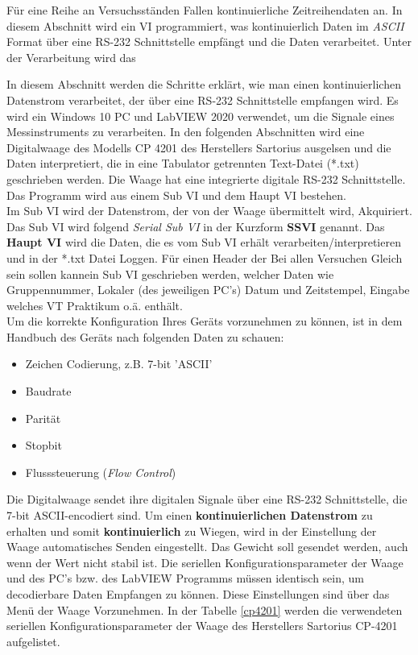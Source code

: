 \documentclass[
fontsize=12pt, 
paper=a4, 
BCOR=10mm, 
twoside=false,
 DIV=10, 
 headsepline, 
 footsepline
 ]{scrartcl}
\begin{document}
Für eine Reihe an Versuchsständen Fallen kontinuierliche Zeitreihendaten an. In diesem Abschnitt wird ein VI programmiert, was kontinuierlich Daten im \textit{ASCII} Format über eine RS-232 Schnittstelle empfängt und die Daten verarbeitet. Unter der Verarbeitung wird das 

In diesem Abschnitt werden die Schritte erklärt, wie man einen kontinuierlichen Datenstrom verarbeitet, der über eine RS-232 Schnittstelle empfangen wird. Es wird ein Windows 10 PC und LabVIEW 2020 verwendet, um die Signale eines Messinstruments zu verarbeiten. In den folgenden Abschnitten wird eine Digitalwaage des Modells CP 4201 des Herstellers Sartorius ausgelsen und die Daten interpretiert, die in eine Tabulator getrennten Text-Datei (*.txt) geschrieben werden. Die Waage hat eine integrierte digitale RS-232 Schnittstelle. Das Programm wird aus einem Sub VI und dem Haupt VI bestehen. \\


Im Sub VI wird der Datenstrom, der von der Waage übermittelt wird, Akquiriert. Das Sub VI wird folgend \textit{Serial Sub VI} in der Kurzform \textbf{SSVI} genannt. Das \textbf{Haupt VI} wird die Daten, die es vom Sub VI erhält verarbeiten/interpretieren und in der *.txt Datei Loggen. Für einen Header der Bei allen Versuchen Gleich sein sollen kannein Sub VI geschrieben werden, welcher Daten wie Gruppennummer, Lokaler (des jeweiligen PC's) Datum und Zeitstempel, Eingabe welches VT Praktikum o.ä. enthält.\\

Um die korrekte Konfiguration Ihres Geräts vorzunehmen zu können, ist in dem Handbuch des Geräts nach folgenden Daten zu schauen:

\begin{itemize}
\item Zeichen Codierung, z.B. 7-bit 'ASCII'
\item Baudrate
\item Parität
\item Stopbit
\item Flusssteuerung (\textit{Flow Control})
\end{itemize}

Die Digitalwaage sendet ihre digitalen Signale über eine RS-232 Schnittstelle, die 7-bit ASCII-encodiert sind. Um einen \textbf{kontinuierlichen Datenstrom} zu erhalten und somit \textbf{kontinuierlich} zu Wiegen, wird in der Einstellung der Waage \glqq automatisches Senden\grqq{} eingestellt. Das Gewicht soll gesendet werden, auch wenn der Wert nicht stabil ist. Die seriellen Konfigurationsparameter der Waage und des PC's bzw. des LabVIEW Programms müssen identisch sein, um decodierbare Daten Empfangen zu können. Diese Einstellungen sind über das Menü der Waage Vorzunehmen. In der Tabelle \ref{cp4201} werden die verwendeten seriellen Konfigurationsparameter der Waage des Herstellers Sartorius CP-4201 aufgelistet.
\end{document}
